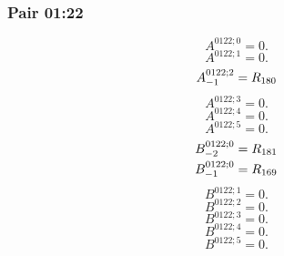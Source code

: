 \documentclass[11pt,a4paper]{article}
\begin{document}
\subsubsection{Pair 01:22}
\begin{equation}
A^{0122;0}=0.
\label{eq:cat-map-150}
\end{equation}
\begin{equation}
A^{0122;1}=0.
\label{eq:cat-map-151}
\end{equation}
\begin{equation}
\shortstack[l]{$\displaystyle A^{0122;2}_{-1}=R_{180}$}
\label{eq:cat-map-152}
\end{equation}
\begin{equation}
A^{0122;3}=0.
\label{eq:cat-map-153}
\end{equation}
\begin{equation}
A^{0122;4}=0.
\label{eq:cat-map-154}
\end{equation}
\begin{equation}
A^{0122;5}=0.
\label{eq:cat-map-155}
\end{equation}
\begin{equation}
\shortstack[l]{$\displaystyle B^{0122;0}_{-2}=R_{181}$\\
$\displaystyle B^{0122;0}_{-1}=R_{169}$}
\label{eq:cat-map-156}
\end{equation}
\begin{equation}
B^{0122;1}=0.
\label{eq:cat-map-157}
\end{equation}
\begin{equation}
B^{0122;2}=0.
\label{eq:cat-map-158}
\end{equation}
\begin{equation}
B^{0122;3}=0.
\label{eq:cat-map-159}
\end{equation}
\begin{equation}
B^{0122;4}=0.
\label{eq:cat-map-160}
\end{equation}
\begin{equation}
B^{0122;5}=0.
\label{eq:cat-map-161}
\end{equation}
\end{document}
